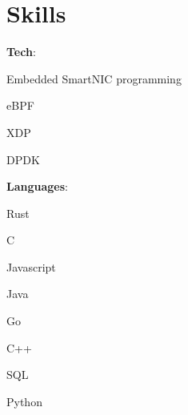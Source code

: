 \section{Skills}
\begin{cvitemize}
	\item \textbf{Tech}:
	\begin{inlineItemize}
		\item Embedded SmartNIC programming
		\item eBPF
		\item XDP
		\item DPDK
	\end{inlineItemize}
	\item \textbf{Languages}:
	\begin{inlineItemize}
		\item Rust
		\item C
		\item Javascript
		\item Java
		\item Go
		\item C++
		\item SQL
		\item Python
	\end{inlineItemize}
\end{cvitemize}